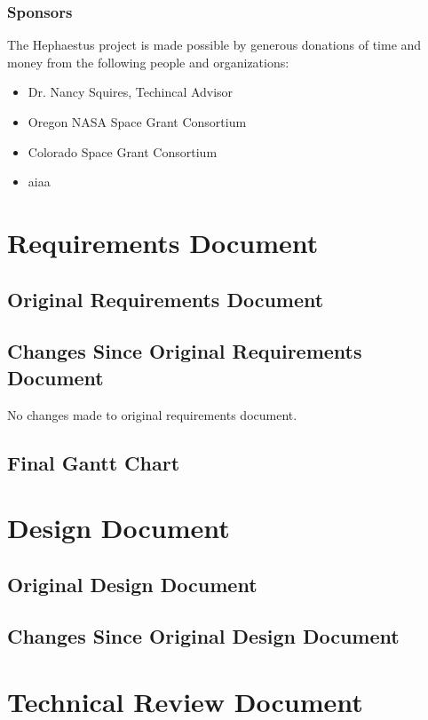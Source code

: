 \documentclass[letterpaper,10pt]{article}
\begin{document}
\subsubsection{Sponsors}
The Hephaestus project is made possible by generous donations of time and money
from the following people and organizations:
\begin{itemize}
  \item{Dr. Nancy Squires, Techincal Advisor}
  \item{Oregon NASA Space Grant Consortium}
  \item{Colorado Space Grant Consortium}
  \item{\gls{aiaa}}
\end{itemize}

\section{Requirements Document}
\subsection{Original Requirements Document}


\subsection{Changes Since Original Requirements Document}
No changes made to original requirements document.

\subsection{Final Gantt Chart}


\section{Design Document}
\subsection{Original Design Document}


\subsection{Changes Since Original Design Document}


\section{Technical Review Document}
\end{document}
